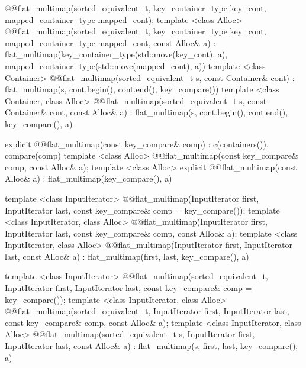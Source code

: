 \begin{codeblock}
{{    @@flat_multimap(sorted_equivalent_t,
                            key_container_type key_cont, mapped_container_type mapped_cont);
    template <class Alloc>
    @@flat_multimap(sorted_equivalent_t, key_container_type key_cont,
                            mapped_container_type mapped_cont, const Alloc& a)
        : flat_multimap(key_container_type(std::move(key_cont), a),
                        mapped_container_type(std::move(mapped_cont), a))
      { }
    template <class Container>
      @@flat_multimap(sorted_equivalent_t s, const Container& cont)
        : flat_multimap(s, cont.begin(), cont.end(), key_compare()) { }
    template <class Container, class Alloc>
      @@flat_multimap(sorted_equivalent_t s, const Container& cont, const Alloc& a)
        : flat_multimap(s, cont.begin(), cont.end(), key_compare(), a) { }

    explicit @@flat_multimap(const key_compare& comp)
      : c(containers()), compare(comp) { }
    template <class Alloc>
      @@flat_multimap(const key_compare& comp, const Alloc& a);
    template <class Alloc>
      explicit @@flat_multimap(const Alloc& a)
        : flat_multimap(key_compare(), a) { }

    template <class InputIterator>
      @@flat_multimap(InputIterator first, InputIterator last,
                              const key_compare& comp = key_compare());
    template <class InputIterator, class Alloc>
      @@flat_multimap(InputIterator first, InputIterator last,
                              const key_compare& comp, const Alloc& a);
    template <class InputIterator, class Alloc>
      @@flat_multimap(InputIterator first, InputIterator last,
                              const Alloc& a)
        : flat_multimap(first, last, key_compare(), a) { }

    template <class InputIterator>
      @@flat_multimap(sorted_equivalent_t, InputIterator first, InputIterator last,
                              const key_compare& comp = key_compare());
    template <class InputIterator, class Alloc>
      @@flat_multimap(sorted_equivalent_t, InputIterator first, InputIterator last,
                              const key_compare& comp, const Alloc& a);
    template <class InputIterator, class Alloc>
      @@flat_multimap(sorted_equivalent_t s, InputIterator first, InputIterator last,
                              const Alloc& a)
        : flat_multimap(s, first, last, key_compare(), a) { }

}}
\end{codeblock}
